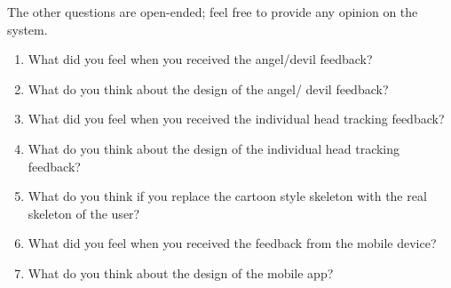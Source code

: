The other questions are open-ended; feel free to provide any opinion on the system.

\begin{enumerate}
  \item What did you feel when you received the angel/devil feedback?
  \item What do you think about the design of the angel/ devil feedback?
  \item What did you feel when you received the individual head tracking feedback?
  \item What do you think about the design of the individual head tracking feedback?
  \item What do you think if you replace the cartoon style skeleton with the real skeleton of the user?
  \item What did you feel when you received the feedback from the mobile device?
  \item What do you think about the design of the mobile app?
\end{enumerate}
